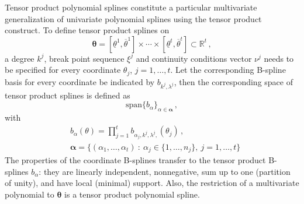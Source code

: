 \documentclass{article}
\newcommand{\R}{\mathbb{R}}         %
\newcommand{\ppar}{\theta}                          %
\newcommand{\Ppar}{{\bm{\theta}}}                   %
\newcommand{\Alpha}{\bm{\alpha}}    %
\newcommand{\pparL}{\underline{\ppar}}
\newcommand{\pparU}{\overline{\ppar}}
\begin{document}
Tensor product polynomial splines constitute a particular multivariate  generalization of univariate polynomial splines using the tensor product construct. To define tensor product splines on
\[  \Ppar = [\pparL^1,\pparU^1] \times \cdots \times  [\pparL^t,\pparU^t] \subset\R^t \,,%
\]
a degree $k^j$, break point sequence $\xi^j$ and continuity conditions vector $\nu^j$ needs to be specified for every coordinate $\ppar_j$, $j=1,\ldots,t$. Let the corresponding B-spline basis for every coordinate be indicated by $b_{k^j,\lambda^j}$, then the corresponding space of tensor product splines is defined as
\[ \text{span} \{b_\alpha\}_{\alpha\in\Alpha} \,,
\]
with
\begin{align*}
& b_\alpha(\ppar) = \prod_{j=1}^t b_{\alpha_j, k^j, \lambda^j,}(\ppar_j) \,,\\%
& \Alpha = \big\{(\alpha_1, \ldots, \alpha_t) ~:~ \alpha_j\in\{1,\ldots,n_j\},~ j=1,\ldots,t \big\}%
\end{align*}
The properties of the coordinate B-splines transfer to the tensor product B-splines $b_\alpha$: they are linearly independent, nonnegative, sum up to one (partition of unity), and have local (minimal) support. Also, the restriction of a multivariate polynomial to $\Ppar$ is a tensor product polynomial spline.
\end{document}
